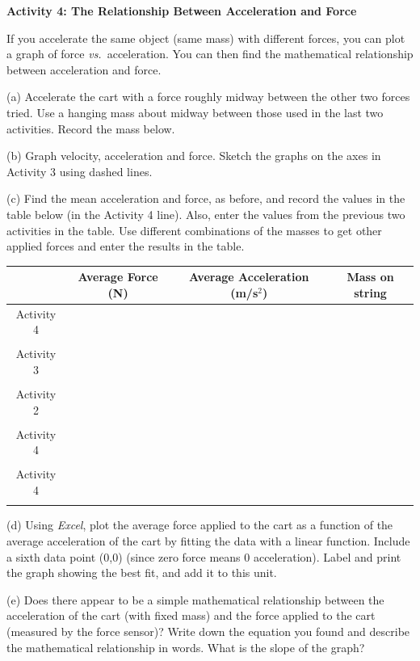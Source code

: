 \pagebreak[2]
\textbf{Activity 4: The Relationship Between Acceleration and Force }

If you accelerate the same object (same mass) with different forces, you can 
plot a graph of force \textit{vs.}~acceleration. You can then find the mathematical relationship between acceleration and force. 

(a) Accelerate the cart with a force roughly midway between the other two forces
tried. Use a hanging mass about midway between those used in the last two activities.
Record the mass below.
\answerspace{10mm}

(b) Graph velocity, acceleration and force. Sketch the graphs on the axes in
Activity 3 using dashed lines.

(c) Find the mean acceleration and force, as before, and record the values in
the table below (in the Activity 4 line). Also, enter the values from the previous 
two activities in the table. Use different combinations of the
masses to get other applied forces and enter the results in the table. 

\vspace{0.3cm}
{\centering \begin{tabular}{|c|c|c|c|}
\hline 
&
Average Force (N)&
Average Acceleration (m/s\( ^{2} \)) &
Mass on string\\
\hline 
Activity 4&
&
&
\\
&
&
&
\\
\hline 
Activity 3&
&
&
\\
&
&
&
\\
\hline 
Activity 2&
&
&
\\
&
&
&
\\
\hline 
Activity 4&
&
&
\\
&
&
&
\\
\hline 
Activity 4&
&
&
\\
&
&
&
\\
\hline 
\end{tabular}\par}
\vspace{0.3cm}

(d) Using \textit{Excel}, plot the average force applied to the cart as a function of the average acceleration of the cart by fitting the data with a linear function. Include a sixth data point (0,0) (since zero force means 0 acceleration). Label and print the graph showing the best fit, and add it to this unit.

(e) Does there appear to be a simple mathematical relationship between the acceleration of the cart (with fixed mass) and the force applied to the cart (measured by the force sensor)? Write down the equation you found and describe the mathematical relationship in words.  What is the slope of the graph?
\answerspace{20mm}

